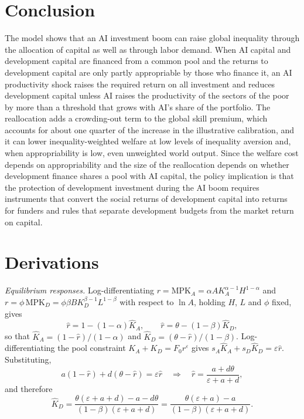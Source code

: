 \documentclass[AER]{AEA}
\newcommand{\sA}{s_A}
\newcommand{\sD}{s_D}
\begin{document}
\section{Conclusion}

The model shows that an AI investment boom can raise global inequality through the allocation of capital as well as through labor demand. When AI capital and development capital are financed from a common pool and the returns to development capital are only partly appropriable by those who finance it, an AI productivity shock raises the required return on all investment and reduces development capital unless AI raises the productivity of the sectors of the poor by more than a threshold that grows with AI's share of the portfolio. The reallocation adds a crowding-out term to the global skill premium, which accounts for about one quarter of the increase in the illustrative calibration, and it can lower inequality-weighted welfare at low levels of inequality aversion and, when appropriability is low, even unweighted world output. Since the welfare cost depends on appropriability and the size of the reallocation depends on whether development finance shares a pool with AI capital, the policy implication is that the protection of development investment during the AI boom requires instruments that convert the social returns of development capital into returns for funders and rules that separate development budgets from the market return on capital.




\appendix

\section{Derivations}

\textit{Equilibrium responses.} Log-differentiating $r=\mathrm{MPK}_A=\alpha A K_A^{\alpha-1}H^{1-\alpha}$ and $r=\phi\,\mathrm{MPK}_D=\phi\beta B K_D^{\beta-1}L^{1-\beta}$ with respect to $\ln A$, holding $H$, $L$ and $\phi$ fixed, gives
\[
\hat{r}=1-(1-\alpha)\hat{K}_A,\qquad \hat{r}=\theta-(1-\beta)\hat{K}_D ,
\]
so that $\hat{K}_A=(1-\hat{r})/(1-\alpha)$ and $\hat{K}_D=(\theta-\hat{r})/(1-\beta)$. Log-differentiating the pool constraint $K_A+K_D=F_0r^{\varepsilon}$ gives $\sA\hat{K}_A+\sD\hat{K}_D=\varepsilon\hat{r}$. Substituting,
\[
a(1-\hat{r})+d(\theta-\hat{r})=\varepsilon\hat{r}
\quad\Longrightarrow\quad
\hat{r}=\frac{a+d\theta}{\varepsilon+a+d},
\]
and therefore
\[
\hat{K}_D=\frac{\theta(\varepsilon+a+d)-a-d\theta}{(1-\beta)(\varepsilon+a+d)}=\frac{\theta(\varepsilon+a)-a}{(1-\beta)(\varepsilon+a+d)} .
\]
\end{document}
